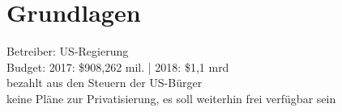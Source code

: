 \section{Grundlagen}
\label{sec:grundlagen}

Betreiber: US-Regierung \\
Budget: 2017: \$908,262 mil. | 2018: \$1,1 mrd \\
bezahlt aus den Steuern der US-Bürger \\
keine Pläne zur Privatisierung, es soll weiterhin frei verfügbar sein \\
